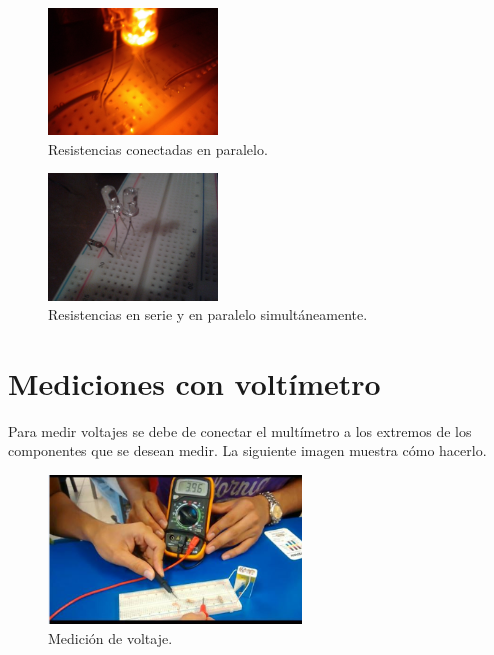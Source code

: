 \documentclass[12pt]{article}
\begin{document}
\begin{figure}[h!]
	\centering
	\includegraphics[width=0.4\textwidth,height=0.17\textheight]{paralelo}
	\caption{Resistencias conectadas en paralelo.}
\end{figure}

\begin{figure}[h!]
	\centering
	\includegraphics[width=0.4\textwidth,height=0.17\textheight]{mixto}
	\caption{Resistencias en serie y en paralelo simultáneamente.}
\end{figure}

\section{Mediciones con voltímetro}

Para medir voltajes se debe de conectar el multímetro a los extremos de los componentes que se desean medir. La siguiente imagen muestra cómo hacerlo.
\\ 

\begin{figure}[h!]
	\centering
	\includegraphics[width=0.6\textwidth,height=0.25\textheight]{voltaje}
	\caption{Medición de voltaje.}
\end{figure}
\end{document}
